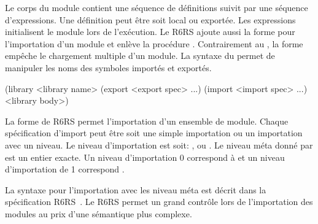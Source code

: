 Le corps du module contient une séquence de définitions suivit par une séquence
d'expressions. Une définition peut être soit local ou exportée. Les expressions
initialisent le module lors de l'exécution.  Le R6RS ajoute aussi la forme
 pour l'importation d'un module et enlève la procédure
.  Contrairement au , la forme 
empêche le chargement multiple d'un module.  La syntaxe du 
permet de manipuler les noms des symboles importés et exportés.\\
\begin{center}
  \begin{mplisting}{0.5}
(library <library name>
  (export <export spec> ...)
  (import <import spec> ...)
  <library body>)
\end{mplisting}
\end{center}

La forme  de R6RS permet l'importation d'un ensemble de module.
Chaque spécification d'import  peut être soit une simple
importation ou un importation avec un niveau. Le niveau d'importation est soit:
,  ou .  Le niveau méta
donné par  est un entier exacte. Un niveau d'importation 0
correspond à  et un niveau d'importation de 1 correspond
.



La syntaxe pour l'importation avec les niveau méta est décrit dans la
spécification R6RS~\cite{Scheme:R6RS}. Le  R6RS permet un grand
contrôle lors de l'importation des modules au prix d'une sémantique plus complexe.

